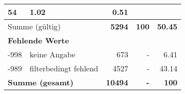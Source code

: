 \begin{longtable}{lXrrr}
       \num{54} &
       \num[round-mode=places,round-precision=2]{1.02} &
         \num[round-mode=places,round-precision=2]{0.51} \\
     \midrule
     \multicolumn{2}{l}{Summe (gültig)} &
       \textbf{\num{5294}} &
     \textbf{\num{100}} &
       \textbf{\num[round-mode=places,round-precision=2]{50.45}} \\
     \multicolumn{5}{l}{\textbf{Fehlende Werte}}\\
       -998 &
       keine Angabe &
         \num{673} &
        - &
         \num[round-mode=places,round-precision=2]{6.41} \\
       -989 &
       filterbedingt fehlend &
         \num{4527} &
        - &
         \num[round-mode=places,round-precision=2]{43.14} \\
     \midrule
     \multicolumn{2}{l}{\textbf{Summe (gesamt)}} &
          \textbf{\num{10494}} &
        \textbf{-} &
        \textbf{\num{100}} \\
     \bottomrule
     \end{longtable}
     
